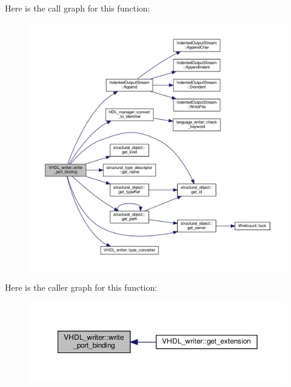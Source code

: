 Here is the call graph for this function\+:
\nopagebreak
\begin{figure}[H]
\begin{center}
\leavevmode
\includegraphics[width=350pt]{d0/d0c/structVHDL__writer_ab460a8caf690d621561c8ea8705d7438_cgraph}
\end{center}
\end{figure}
Here is the caller graph for this function\+:
\nopagebreak
\begin{figure}[H]
\begin{center}
\leavevmode
\includegraphics[width=350pt]{d0/d0c/structVHDL__writer_ab460a8caf690d621561c8ea8705d7438_icgraph}
\end{center}
\end{figure}
\mbox{\label{structVHDL__writer_a19481913996a5ac739d788aa43f9a2a9}} 

